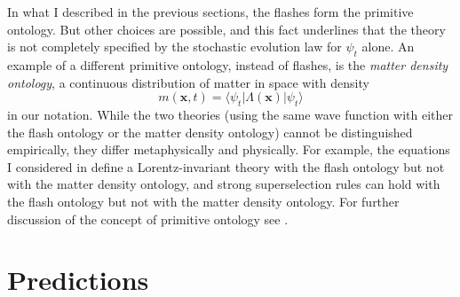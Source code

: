 \documentclass[12pt]{article}
\renewcommand{\sp}[2]{\langle #1 | #2 \rangle}
\newcommand{\vx}{\boldsymbol{x}}
\newcommand{\1}{1}
\begin{document}
In what I described in the previous sections, the flashes form the primitive ontology. But other choices are possible, and this fact underlines that the theory is not completely specified by the stochastic evolution law for $\psi_t$ alone. An example of a different primitive ontology, instead of flashes, is the \emph{matter density ontology}, a continuous distribution of matter in space with density
\begin{equation}\label{mdef}
  m(\vx,t) = \sp{\psi_t}{\Lambda(\vx)|\psi_t}
\end{equation}
in our notation. While the two theories (using the same wave function with either the flash ontology or the matter density ontology) cannot be distinguished empirically, they differ metaphysically and physically. For example, the equations I considered in \cite{Tum05} define a Lorentz-invariant theory with the flash ontology but not with the matter density ontology, and strong superselection rules \cite{ssr} can hold with the flash ontology but not with the matter density ontology. For further discussion of the concept of primitive ontology see \cite{AGTZ}.






\section{Predictions}
\end{document}
